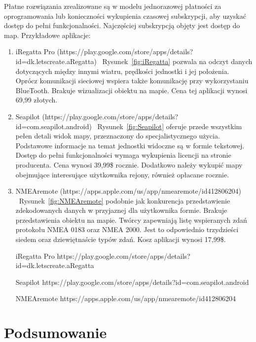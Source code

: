 \documentclass[skorowidz,skroty]{dyplomWEZUT}
\begin{document}
Płatne rozwiązania zrealizowane są w modelu jednorazowej płatności za oprogramowania lub konieczności wykupienia czasowej subskrypcji, aby uzyskać dostęp do pełni funkcjonalności. Najczęściej subskrypcją objęty jest dostęp do map. Przykładowe aplikacje:
\begin{enumerate}

\item iRegatta Pro (https://play.google.com/store/apps/details?id=dk.letscreate.aRegatta) ~Rysunek~\ref{fig:iRegatta} pozwala na odczyt danych dotyczących między innymi wiatru, prędkości jednostki i jej położenia. Oprócz komunikacji sieciowej wspiera także komunikację przy wykorzystaniu BlueTooth. Brakuje wizualizacji obiektu na mapie. Cena tej aplikacji wynosi 69,99 złotych.

\item Seapilot (https://play.google.com/store/apps/details?id=com.seapilot.android) ~Rysunek~\ref{fig:Seapilot} oferuje przede wszystkim pełen detali widok mapy, przeznaczony do specjalistycznego użycia. Podstawowe informacje na temat jednostki widoczne są w formie tekstowej. Dostęp do pełni funkcjonalności wymaga wykupienia licencji na stronie producenta. Cena wynosi 39,99\$ rocznie. Dodatkowo należy wykupić mapy obejmujące interesujące użytkownika rejony, również opłacane rocznie.

\item NMEAremote (https://apps.apple.com/us/app/nmearemote/id412806204) ~Rysunek~\ref{fig:NMEAremote} podobnie jak konkurencja przedstawienie zdekodowanych danych w przyjaznej dla użytkownika formie. Brakuje przedstawienia obiektu na mapie. Twórcy zapewniają listę wspieranych zdań protokołu NMEA 0183 oraz NMEA 2000. Jest to odpowiednio trzydzieści siedem oraz dziewiętnaście typów zdań. Kosz aplikacji wynosi 17,99\$.  


{iRegatta Pro \label{fig:iRegatta}}
{https://play.google.com/store/apps/details?id=dk.letscreate.aRegatta}

{Seapilot \label{fig:Seapilot}}
{https://play.google.com/store/apps/details?id=com.seapilot.android} 

{NMEAremote \label{fig:NMEAremote}}
{https://apps.apple.com/us/app/nmearemote/id412806204} 


\end{enumerate}

\section{Podsumowanie}\label{chap: summary}
\end{document}
